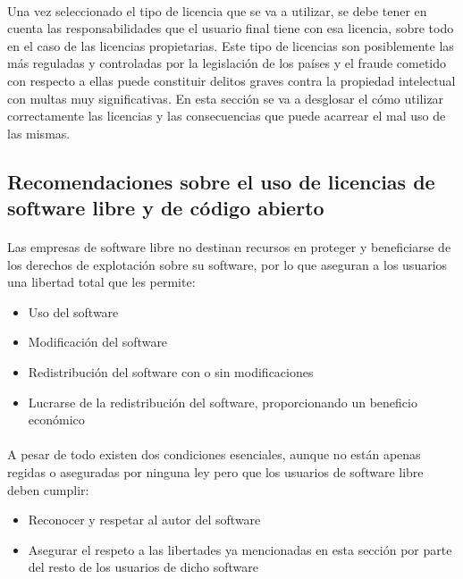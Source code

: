 \documentclass[10pt]{article}
\begin{document}
        \paragraph{}
        Una vez seleccionado el tipo de licencia que se va a utilizar, se debe tener en cuenta las responsabilidades que el usuario final tiene con esa licencia, sobre todo en el caso de las licencias propietarias. Este tipo de licencias son posiblemente las más reguladas y controladas por la legislación de los países y el fraude cometido con respecto a ellas puede constituir delitos graves contra la propiedad intelectual con multas muy significativas. En esta sección se va a desglosar el cómo utilizar correctamente las licencias y las consecuencias que puede acarrear el mal uso de las mismas.
        
        \subsection{Recomendaciones sobre el uso de licencias de software libre y de código abierto}
        \paragraph{}
        Las empresas de software libre no destinan recursos en proteger y beneficiarse de los derechos de explotación sobre su software, por lo que aseguran a los usuarios  una libertad total que les permite:
        \begin{itemize}
        \item Uso del software
        \item Modificación del software
        \item Redistribución del software con o sin modificaciones
		\item Lucrarse de la redistribución del software, proporcionando un beneficio económico
        \end{itemize}
        \paragraph{}
        A pesar de todo existen dos condiciones esenciales, aunque no están apenas regidas o aseguradas por ninguna ley pero que los usuarios de software libre deben cumplir:
		\begin{itemize}
		\item Reconocer y respetar al autor del software
		\item Asegurar el respeto a las libertades ya mencionadas en esta sección por parte del resto de los usuarios de dicho software
		\end{itemize}
\end{document}
